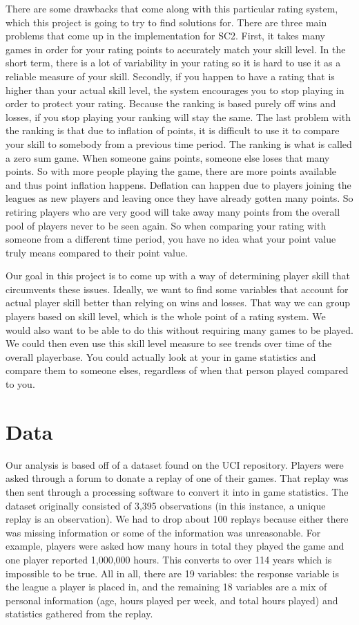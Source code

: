 \documentclass[letterpaper,10pt,english]{/usr/share/sphinx/texinputs/sphinxhowto}
\begin{document}
There are some drawbacks that come along with this particular rating
system, which this project is going to try to find solutions for. There
are three main problems that come up in the implementation for SC2.
First, it takes many games in order for your rating points to accurately
match your skill level. In the short term, there is a lot of variability
in your rating so it is hard to use it as a reliable measure of your
skill. Secondly, if you happen to have a rating that is higher than your
actual skill level, the system encourages you to stop playing in order
to protect your rating. Because the ranking is based purely off wins and
losses, if you stop playing your ranking will stay the same. The last
problem with the ranking is that due to inflation of points, it is
difficult to use it to compare your skill to somebody from a previous
time period. The ranking is what is called a zero sum game. When someone
gains points, someone else loses that many points. So with more people
playing the game, there are more points available and thus point
inflation happens. Deflation can happen due to players joining the
leagues as new players and leaving once they have already gotten many
points. So retiring players who are very good will take away many points
from the overall pool of players never to be seen again. So when
comparing your rating with someone from a different time period, you
have no idea what your point value truly means compared to their point
value.

Our goal in this project is to come up with a way of determining player
skill that circumvents these issues. Ideally, we want to find some
variables that account for actual player skill better than relying on
wins and losses. That way we can group players based on skill level,
which is the whole point of a rating system. We would also want to be
able to do this without requiring many games to be played. We could then
even use this skill level measure to see trends over time of the overall
playerbase. You could actually look at your in game statistics and
compare them to someone elses, regardless of when that person played
compared to you.\part{Data}Our analysis is based off of a dataset found on the UCI repository.
Players were asked through a forum to donate a replay of one of their
games. That replay was then sent through a processing software to
convert it into in game statistics. The dataset originally consisted of
3,395 observations (in this instance, a unique replay is an
observation). We had to drop about 100 replays because either there was
missing information or some of the information was unreasonable. For
example, players were asked how many hours in total they played the game
and one player reported 1,000,000 hours. This converts to over 114 years
which is impossible to be true. All in all, there are 19 variables: the
response variable is the league a player is placed in, and the remaining
18 variables are a mix of personal information (age, hours played per
week, and total hours played) and statistics gathered from the replay.
\end{document}
